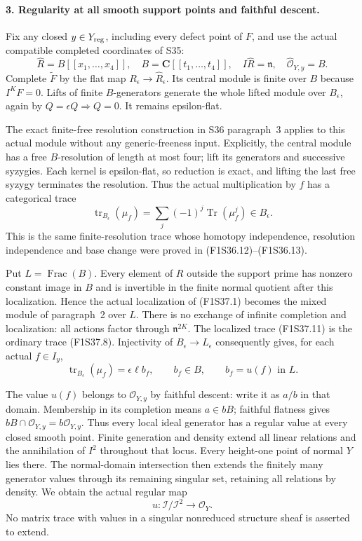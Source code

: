 \paragraph{3. Regularity at all smooth support points and faithful descent.}
Fix any closed $y\in Y_{\rm reg}$, including
every defect point of $F$, and use the actual
compatible completed coordinates of S35:
\[
 \widehat R=B[[x_1,\ldots,x_4]],\quad
 B=\mathbf C[[t_1,\ldots,t_4]],\quad
 I\widehat R=\mathfrak n,\quad
 \widehat{\mathcal O}_{Y,y}=B.
 \tag{F1S37.10}
\]
Complete $\widetilde F$ by the flat map
$R_\epsilon\to\widehat R_\epsilon$.
Its central module is finite over $B$
because $I^KF=0$. Lifts of finite
$B$-generators generate the whole lifted
module over $B_\epsilon$, again by
$Q=\epsilon Q\Rightarrow Q=0$.
It remains epsilon-flat.

The exact finite-free resolution construction
in S36 paragraph~3 applies to this actual
module without any generic-freeness input.
Explicitly, the central module has a free
$B$-resolution of length at most four;
lift its generators and successive syzygies.
Each kernel is epsilon-flat, so reduction
is exact, and lifting the last free syzygy
terminates the resolution. Thus the actual
multiplication by $f$ has a categorical trace
\[
 \operatorname{tr}_{B_\epsilon}(\mu_f)
       =\sum_j(-1)^j\operatorname{Tr}(\mu_f^j)
                        \in B_\epsilon.
 \tag{F1S37.11}
\]
This is the same finite-resolution trace
whose homotopy independence, resolution
independence and base change were proved
in (F1S36.12)--(F1S36.13).

Put $L=\operatorname{Frac}(B)$.
Every element of $R$ outside the support
prime has nonzero constant image in $B$
and is invertible in the finite normal
quotient after this localization.
Hence the actual localization of
(F1S37.1) becomes the mixed module of
paragraph~2 over $L$. There is no exchange
of infinite completion and localization:
all actions factor through
$\mathfrak n^{2K}$.
The localized trace (F1S37.11) is the
ordinary trace (F1S37.8). Injectivity of
$B_\epsilon\to L_\epsilon$ consequently
gives, for each actual $f\in I_y$,
\[
       \operatorname{tr}_{B_\epsilon}(\mu_f)
                         =\epsilon\ell b_f,
              \qquad b_f\in B,
              \qquad b_f=u(f)\text{ in }L.
 \tag{F1S37.12}
\]

The value $u(f)$ belongs to
$\mathcal O_{Y,y}$ by faithful descent:
write it as $a/b$ in that domain.
Membership in its completion means
$a\in bB$; faithful flatness gives
$bB\cap\mathcal O_{Y,y}=b\mathcal O_{Y,y}$.
Thus every local ideal generator has a
regular value at every closed smooth
point. Finite generation and density
extend all linear relations and the
annihilation of $I^2$ throughout that
locus. Every height-one point of normal
$Y$ lies there. The normal-domain
intersection then extends the finitely
many generator values through its
remaining singular set, retaining all
relations by density. We obtain the
actual regular map
\[
                  u:\mathcal I/\mathcal I^2
                              \longrightarrow\mathcal O_Y.
 \tag{F1S37.13}
\]
No matrix trace with values in a singular
nonreduced structure sheaf is asserted
to extend.

